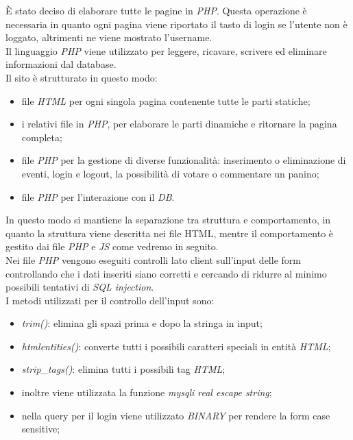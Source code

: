È stato deciso di elaborare tutte le pagine in \emph{PHP}. Questa operazione è necessaria in quanto ogni 
pagina viene riportato il tasto di login se l'utente non è loggato, altrimenti ne viene mostrato l'username.\\
Il linguaggio \emph{PHP} viene utilizzato per leggere, ricavare, scrivere ed eliminare informazioni dal database.\\
Il sito è strutturato in questo modo: 
\begin{itemize}
    \item file \emph{HTML} per ogni singola pagina contenente tutte le parti statiche;
    \item i relativi file in \emph{PHP}, per elaborare le parti dinamiche e ritornare la pagina completa;
    \item file \emph{PHP} per la gestione di diverse funzionalità: inserimento o eliminazione di eventi, login e logout, la possibilità di votare o commentare un panino;
    \item file \emph{PHP} per l'interazione con il \emph{DB}.
\end{itemize}
In questo modo si mantiene la separazione tra struttura e comportamento, in quanto la struttura viene descritta nei file HTML, mentre il comportamento è gestito dai file \emph{PHP} e \emph{JS} come vedremo in seguito.\\

Nei file \emph{PHP} vengono eseguiti controlli lato client sull'input delle form controllando che i dati inseriti siano corretti e cercando di ridurre al minimo possibili tentativi di \emph{SQL injection}.\\
I metodi utilizzati per il controllo dell'input sono: 
    \begin{itemize}
        \item \emph{trim()}: elimina gli spazi prima e dopo la stringa in input;
        \item \emph{htmlentities()}: converte tutti i possibili caratteri speciali in entità \emph{HTML};
        \item \emph{strip\_tags()}: elimina tutti i possibili tag \emph{HTML};
        \item inoltre viene utilizzata la funzione \emph{mysqli real escape string};
        \item nella query per il login viene utilizzato \emph{BINARY} per rendere la form case sensitive;
    \end{itemize}